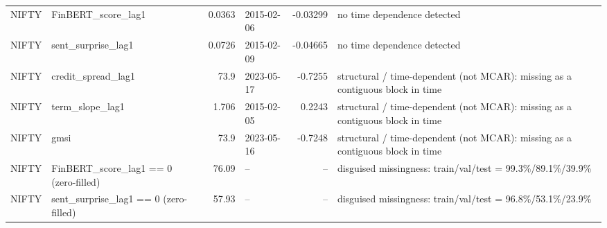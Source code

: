 \begin{table}[htbp]
\begin{tabular}{llrlrl}
NIFTY & FinBERT\_score\_lag1 & 0.0363 & 2015-02-06 & -0.03299 & no time dependence detected \\
NIFTY & sent\_surprise\_lag1 & 0.0726 & 2015-02-09 & -0.04665 & no time dependence detected \\
NIFTY & credit\_spread\_lag1 & 73.9 & 2023-05-17 & -0.7255 & structural / time-dependent (not MCAR): missing as a contiguous block in time \\
NIFTY & term\_slope\_lag1 & 1.706 & 2015-02-05 & 0.2243 & structural / time-dependent (not MCAR): missing as a contiguous block in time \\
NIFTY & gmsi & 73.9 & 2023-05-16 & -0.7248 & structural / time-dependent (not MCAR): missing as a contiguous block in time \\
NIFTY & FinBERT\_score\_lag1 == 0 (zero-filled) & 76.09 & -- & -- & disguised missingness: train/val/test = 99.3\%/89.1\%/39.9\% \\
NIFTY & sent\_surprise\_lag1 == 0 (zero-filled) & 57.93 & -- & -- & disguised missingness: train/val/test = 96.8\%/53.1\%/23.9\% \\
\bottomrule
\end{tabular}
\end{table}
